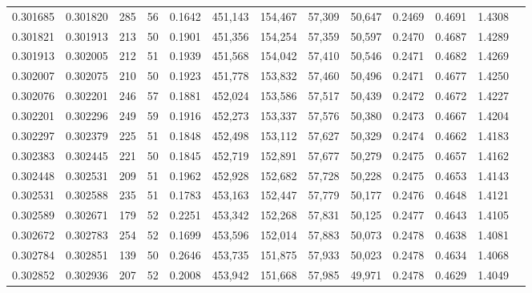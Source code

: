 \begin{tabular}{rrrrrrrrrrrrr}
0.301685 & 0.301820 &   285 &  56 &                                     0.1642 & 451,143 & 154,467 &  57,309 &  50,647 & 0.2469 & 0.4691 & 1.4308 \\
0.301821 & 0.301913 &   213 &  50 &                                     0.1901 & 451,356 & 154,254 &  57,359 &  50,597 & 0.2470 & 0.4687 & 1.4289 \\
0.301913 & 0.302005 &   212 &  51 &                                     0.1939 & 451,568 & 154,042 &  57,410 &  50,546 & 0.2471 & 0.4682 & 1.4269 \\
0.302007 & 0.302075 &   210 &  50 &                                     0.1923 & 451,778 & 153,832 &  57,460 &  50,496 & 0.2471 & 0.4677 & 1.4250 \\
0.302076 & 0.302201 &   246 &  57 &                                     0.1881 & 452,024 & 153,586 &  57,517 &  50,439 & 0.2472 & 0.4672 & 1.4227 \\
0.302201 & 0.302296 &   249 &  59 &                                     0.1916 & 452,273 & 153,337 &  57,576 &  50,380 & 0.2473 & 0.4667 & 1.4204 \\
0.302297 & 0.302379 &   225 &  51 &                                     0.1848 & 452,498 & 153,112 &  57,627 &  50,329 & 0.2474 & 0.4662 & 1.4183 \\
0.302383 & 0.302445 &   221 &  50 &                                     0.1845 & 452,719 & 152,891 &  57,677 &  50,279 & 0.2475 & 0.4657 & 1.4162 \\
0.302448 & 0.302531 &   209 &  51 &                                     0.1962 & 452,928 & 152,682 &  57,728 &  50,228 & 0.2475 & 0.4653 & 1.4143 \\
0.302531 & 0.302588 &   235 &  51 &                                     0.1783 & 453,163 & 152,447 &  57,779 &  50,177 & 0.2476 & 0.4648 & 1.4121 \\
0.302589 & 0.302671 &   179 &  52 &                                     0.2251 & 453,342 & 152,268 &  57,831 &  50,125 & 0.2477 & 0.4643 & 1.4105 \\
0.302672 & 0.302783 &   254 &  52 &                                     0.1699 & 453,596 & 152,014 &  57,883 &  50,073 & 0.2478 & 0.4638 & 1.4081 \\
0.302784 & 0.302851 &   139 &  50 &                                     0.2646 & 453,735 & 151,875 &  57,933 &  50,023 & 0.2478 & 0.4634 & 1.4068 \\
0.302852 & 0.302936 &   207 &  52 &                                     0.2008 & 453,942 & 151,668 &  57,985 &  49,971 & 0.2478 & 0.4629 & 1.4049 \\

\end{tabular}
